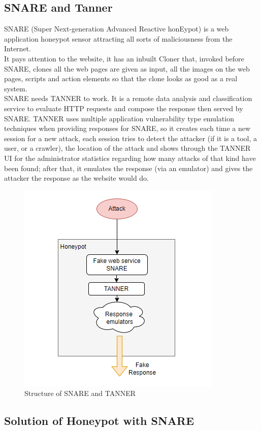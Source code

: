 \subsection{SNARE and Tanner}
SNARE (Super Next-generation Advanced Reactive honEypot) is a web application honeypot sensor attracting all sorts of maliciousness from the Internet.\\
It pays attention to the website, it has an inbuilt Cloner that, invoked before SNARE, clones all the web pages are given as input, all the images on the web pages, scripts and action elements so that the clone looks as good as a real system.\\
SNARE needs TANNER to work. It is a remote data analysis and classification service to evaluate HTTP requests and compose the response then served by SNARE. TANNER uses multiple application vulnerability type emulation techniques when providing responses for SNARE, so it creates each time a new session for a new attack, each session tries to detect the attacker (if it is a tool, a user, or a crawler), the location of the attack and shows through the TANNER UI for the administrator statistics regarding how many attacks of that kind have been found; after that, it emulates the response (via an emulator) and gives the attacker the response as the website would do.

\begin{figure}[h!]
\centering
\includegraphics{images/DHP.png}
\caption{Structure of SNARE and TANNER}
\label{fig:irradiances}
\end{figure}
\FloatBarrier
\subsection{Solution of Honeypot with SNARE}

